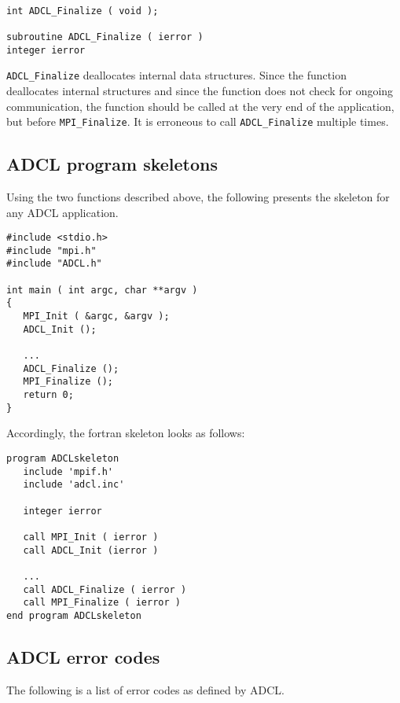 \begin{verbatim}

int ADCL_Finalize ( void );

subroutine ADCL_Finalize ( ierror )
integer ierror
\end{verbatim}

{\tt ADCL\_Finalize} deallocates internal data structures. Since the function deallocates internal structures and since the function does not check for ongoing communication, the function should be called at the very end of the application, but before {\tt MPI\_Finalize}. It is erroneous to call {\tt ADCL\_Finalize} multiple times.

\subsection{ADCL program skeletons}

Using the two functions described above, the following presents the skeleton for any ADCL application.
\begin{verbatim}
#include <stdio.h>
#include "mpi.h"
#include "ADCL.h"

int main ( int argc, char **argv ) 
{
   MPI_Init ( &argc, &argv );
   ADCL_Init ();
   
   ...
   ADCL_Finalize ();
   MPI_Finalize ();
   return 0;
}
\end{verbatim}

Accordingly, the fortran skeleton looks as follows:
\begin{verbatim}
program ADCLskeleton
   include 'mpif.h'
   include 'adcl.inc'
   
   integer ierror
   
   call MPI_Init ( ierror )
   call ADCL_Init (ierror )
   
   ...
   call ADCL_Finalize ( ierror )
   call MPI_Finalize ( ierror )
end program ADCLskeleton
\end{verbatim}

\subsection{ADCL error codes}

The following is a list of error codes as defined by ADCL.

